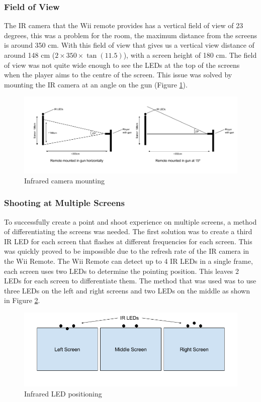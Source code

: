 \documentclass[a4paper,11pt]{article}
\begin{document}
\subsubsection{Field of View}
The IR camera that the Wii remote provides has a vertical field of view of 23 degrees, this was a problem for the room, the maximum distance from the screens is around 350 cm. With this field of view that gives us a vertical view distance of around 148 cm ($2 \times 350 \times \tan(11.5)$), with a screen height of 180 cm. The field of view was not quite wide enough to see the LEDs at the top of the screens when the player aims to the centre of the screen. This issue was solved by mounting the IR camera at an angle on the gun (Figure \ref{fig:ir_mounting}).

\begin{figure}
	\centering
	\includegraphics[scale=0.5]{ir}
    \caption{Infrared camera mounting}
    \label{fig:ir_mounting}
\end{figure}

\subsubsection{Shooting at Multiple Screens}
To successfully create a point and shoot experience on multiple screens, a method of differentiating the screens was needed. The first solution was to create a third IR LED for each screen that flashes at different frequencies for each screen. This was quickly proved to be impossible due to the refresh rate of the IR camera in the Wii Remote. The Wii Remote can detect up to 4 IR LEDs in a single frame, each screen uses two LEDs to determine the pointing position. This leaves 2 LEDs for each screen to differentiate them. The method that was used was to use three LEDs on the left and right screens and two LEDs on the middle as shown in Figure \ref{fig:led_pos}. 

\begin{figure}
	\centering
	\includegraphics[scale=0.5]{led_pos}
    \caption{Infrared LED positioning}
    \label{fig:led_pos}
\end{figure}
\end{document}
